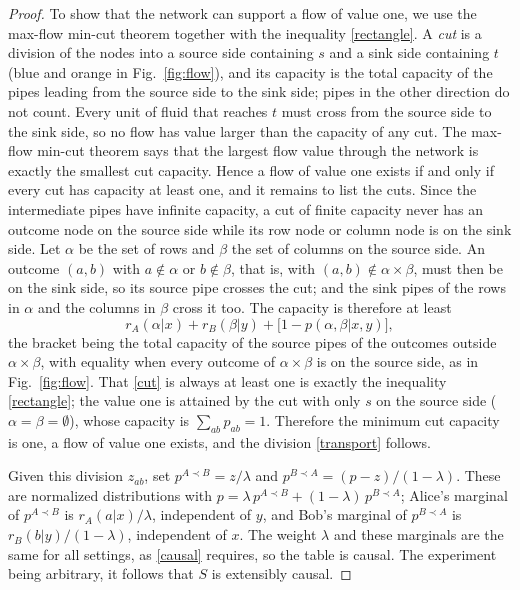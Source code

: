 \documentclass[aps,prl,reprint,superscriptaddress,nofootinbib,longbibliography,raggedbottom]{revtex4-2}
\begin{document}
\begin{proof}
To show that the network can support a flow of value one, we use the
max-flow min-cut theorem together with the inequality \eqref{rectangle}.
A \emph{cut} is a division of the nodes into a source side containing $s$
and a sink side containing $t$ (blue and orange in Fig.~\ref{fig:flow}),
and its capacity is the total capacity of the pipes leading from the
source side to the sink side; pipes in the other direction do not count.
Every unit of fluid that reaches $t$ must cross from the source side to
the sink side, so no flow has value larger than the capacity of any cut.
The max-flow min-cut theorem \cite{FordFulkerson} says that the largest
flow value through the network is exactly the smallest cut capacity.
Hence a flow of value one exists if and only if every cut has capacity at
least one, and it remains to list the cuts. Since the intermediate pipes
have infinite capacity, a cut of finite capacity never has an outcome node
on the source side while its row node or column node is on the sink side.
Let $\alpha$ be the set of rows and $\beta$ the set of columns on the
source side. An outcome $(a,b)$ with $a\notin\alpha$ or $b\notin\beta$,
that is, with $(a,b)\notin\alpha\times\beta$, must then be on the sink
side, so its source pipe crosses the cut; and the sink pipes of the rows in
$\alpha$ and the columns in $\beta$ cross it too. The capacity is
therefore at least
\begin{equation}\label{cut}
r_A(\alpha|x)+r_B(\beta|y)+\bigl[1-p(\alpha,\beta|x,y)\bigr],
\end{equation}
the bracket being the total capacity of the source pipes of the outcomes
outside $\alpha\times\beta$, with equality when every outcome of
$\alpha\times\beta$ is on the source side, as in Fig.~\ref{fig:flow}.
That \eqref{cut} is always at least one is exactly the inequality
\eqref{rectangle}; the value one is attained by the cut with only $s$ on
the source side ($\alpha=\beta=\emptyset$), whose capacity is
$\sum_{ab}p_{ab}=1$. Therefore the minimum cut capacity is one, a flow of
value one exists, and the division \eqref{transport} follows. 

Given this division $z_{ab}$, set $p^{A\prec B}=z/\lambda$ and
$p^{B\prec A}=(p-z)/(1-\lambda)$. These are normalized distributions with
$p=\lambda\,p^{A\prec B}+(1-\lambda)\,p^{B\prec A}$; Alice's marginal of
$p^{A\prec B}$ is $r_A(a|x)/\lambda$, independent of $y$, and Bob's
marginal of $p^{B\prec A}$ is $r_B(b|y)/(1-\lambda)$, independent of $x$.
The weight $\lambda$ and these marginals are the same for all settings, as
\eqref{causal} requires, so the table is causal. The experiment being
arbitrary, it follows that $S$ is extensibly causal.
\end{proof}
\end{document}
